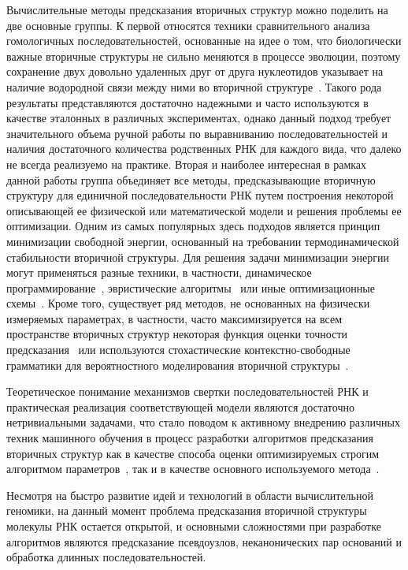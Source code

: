 Вычислительные методы предсказания вторичных структур можно поделить на две основные группы. К первой относятся техники сравнительного анализа гомологичных последовательностей, основанные на идее о том, что биологически важные вторичные структуры не сильно меняются в процессе эволюции, поэтому сохранение двух довольно удаленных друг от друга нуклеотидов указывает на наличие водородной связи между ними во вторичной структуре~\cite{gutell2002accuracy,chen1999rna}. Такого рода результаты представляются достаточно надежными и часто используются в качестве эталонных в различных экспериментах, однако данный подход требует значительного объема ручной работы по выравниванию последовательностей и наличия достаточного количества родственных РНК для каждого вида, что далеко не всегда реализуемо на практике. Вторая и наиболее интересная в рамках данной работы группа объединяет все методы, предсказывающие вторичную структуру для единичной последовательности РНК путем построения некоторой описывающей ее физической или математической модели и решения проблемы ее оптимизации. 
Одним из самых популярных здесь подходов является принцип минимизации свободной энергии, основанный на требовании термодинамической стабильности вторичной структуры. Для решения задачи минимизации энергии могут применяться разные техники, в частности, динамическое программирование~\cite{bellaousov2013rnastructure,rivas1999dynamic}, эвристические алгоритмы~\cite{ren2005hotknots,ruan2004ilm} или иные оптимизационные схемы~\cite{reeder2007pknotsrg, jabbari2018knotty}. Кроме того, существует ряд методов, не основанных на физически измеряемых параметрах, в частности, часто максимизируется на всем пространстве вторичных структур некоторая функция оценки точности предсказания~\cite{hamada2009prediction,sato2009centroidfold} или используются стохастические контекстно-свободные грамматики для вероятностного моделирования вторичной структуры~\cite{knudsen1999rna,dowell2004evaluation}. 

Теоретическое понимание механизмов свертки последовательностей РНК и практическая реализация соответствующей модели являются достаточно нетривиальными задачами, что стало поводом к активному внедрению различных техник машинного обучения в процесс разработки алгоритмов предсказания вторичных структур как в качестве способа оценки оптимизируемых строгим алгоритмом параметров~\cite{akiyama2018max,do2006contrafold}, так и в качестве основного используемого метода~\cite{singh2019rna,apolloni2003rna}.

Несмотря на быстро развитие идей и технологий в области вычислительной геномики, на данный момент проблема предсказания вторичной структуры молекулы РНК остается открытой, и основными сложностями при разработке алгоритмов являются предсказание псевдоузлов, неканонических пар оснований и обработка длинных последовательностей.


